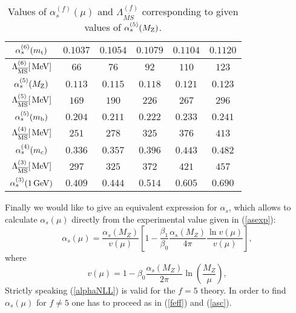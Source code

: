 \documentclass[12pt]{article}
\def\as{\alpha_s}
\newcommand{\mt}{m_{\rm t}}
\newcommand{\mc}{m_{\rm c}}
\newcommand{\mb}{m_{\rm b}}
\newcommand{\mz}{M_{\rm Z}}
\newcommand{\gev}{\, {\rm GeV}}
\newcommand{\mev}{\, {\rm MeV}}
\newcommand{\Lms}{\Lambda_{\overline{\rm MS}}}
\newcommand{\be}{\begin{equation}}
\newcommand{\ee}{\end{equation}}
\newcommand{\f}{\frac}
\begin{document}
\begin{itemize}
\begin{itemize}
\begin{table}[thb]
\caption[]{Values of $\alpha^{(f)}_s(\mu)$ and
$\Lambda^{(f)}_{\overline{MS}}$ corresponding to given values of
$\alpha_s^{(5)}(\mz)$.
\label{tab:alphas}}
\begin{center}
\begin{tabular}{|c|c|c|c|c|c|}\hline
 $\alpha_s^{(6)}(\mt)$& $0.1037$& $0.1054$& $0.1079$ & $0.1104$ &  $0.1120$ 
\\ \hline
 $\Lms^{(6)}[\mev]$& $66$& $76$& $92$ & $110$ &  $123$ 
\\ \hline\hline
 $\alpha_s^{(5)}(\mz)$& $0.113$& $0.115$& $0.118$ & $0.121$ &  $0.123$ 
\\ \hline
 $\Lms^{(5)}[\mev]$& $169$& $190$& $226$ & $267$ &  $296$ 
\\ \hline
 $\alpha_s^{(5)}(\mb)$& $0.204$& $0.211$& $0.222$ & $0.233$ &  $0.241$ 
\\ \hline\hline
 $\Lms^{(4)}[\mev]$& $251$& $278$& $325$ & $376$ &  $413$ 
\\ \hline
 $\alpha_s^{(4)}(\mc)$& $0.336$& $0.357$& $0.396$ & $0.443$ &  $0.482$ 
\\ \hline\hline
 $\Lms^{(3)}[\mev]$& $297$& $325$& $372$ & $421$ &  $457$ 
\\ \hline
 $\alpha_s^{(3)}(1\gev)$& $0.409$& $0.444$& $0.514$ & $0.605$ &  $0.690$ 
\\ \hline
 \end{tabular}
\end{center}
\end{table}
Finally we would like to give an equivalent expression for $\alpha_s$,
which allows to calculate $\alpha_{s}(\mu)$ directly from
the experimental value given in (\ref{asexp}):
%
\be\label{alphaNLL}
\as(\mu) = \frac{\as(M_Z)}{v(\mu)} \left[1 - \f{\beta_1}{\beta_0} 
           \frac{\as(M_Z)}{4 \pi}    \f{\ln v(\mu)}{v(\mu)} \right],
\ee
%
where 
%
\be\label{v(mu)}
v(\mu) = 1 - \beta_0 \frac{\as(M_Z)}{2 \pi} 
\ln \left( \frac{M_Z}{\mu} \right),
\ee
Strictly speaking (\ref{alphaNLL}) is valid for the $f=5$ theory.
In order to find $\as(\mu)$ for $f\not=5$ one has to proceed as in
(\ref{feff}) and (\ref{asc}).

\end{itemize}
\end{itemize}
\end{document}
